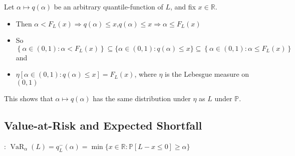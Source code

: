 Let $\alpha \mapsto q(\alpha)$ be an arbitrary quantile-function of $L$, and fix $x \in \mathbb{R}$.
\begin{itemize}[leftmargin=*]
    \item Then $\alpha<F_{L}(x) \Rightarrow q(\alpha) \leq x$,$q(\alpha) \leq x \Rightarrow \alpha \leq F_{L}(x)$
    \item So $\left\{\alpha \in(0,1): \alpha<F_{L}(x)\right\} \subseteq\{\alpha \in(0,1): q(\alpha) \leq x\} \subseteq\left\{\alpha \in(0,1): \alpha \leq F_{L}(x)\right\}$ and
    \item $\eta[\alpha \in(0,1): q(\alpha) \leq x]=F_{L}(x)$, where $\eta$ is the Lebesgue measure on $(0,1)$
\end{itemize}
This shows that $\alpha \mapsto q(\alpha)$ has the same distribution under $\eta$ as $L$ under $\mathbb{P}$.





\subsection*{Value-at-Risk and Expected Shortfall}
: $\operatorname{VaR}_{\alpha}(L)=q_{L}^{-}(\alpha)=\min \{x \in \mathbb{R}: \mathbb{P}[L-x \leq 0] \geq \alpha\}$

